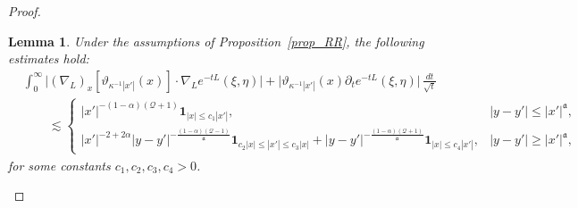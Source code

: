 \documentclass[12pt]{amsart}
\newtheorem{lemma}[theorem]{Lemma}
\begin{document}
\begin{proof}
\begin{lemma}\label{lemma_key2}
Under the assumptions of Proposition~\ref{prop_RR}, the following estimates hold:
\begin{align*}
    &\int_0^\infty  \bigl|(\nabla_L)_x [\vartheta_{\kappa^{-1} |x'|}(x)] \cdot \nabla_L e^{-tL}(\xi,\eta)\bigr| + \bigl|\vartheta_{\kappa^{-1} |x'|}(x) \partial_t e^{-tL}(\xi,\eta)\bigr| \, \frac{dt}{\sqrt{t}} \\
    &\qquad \lesssim 
    \begin{cases}
        |x'|^{-(1-\alpha)(\mathcal{Q}+1)} \mathbf{1}_{|x|\le c_1|x'|}, & |y-y'|\le |x'|^{\mathfrak a},\\[4pt]
        |x'|^{-2+2\alpha} |y-y'|^{-\frac{(1-\alpha)(\mathcal{Q}-1)}{\mathfrak a}} \mathbf{1}_{c_2|x|\le |x'| \le c_3|x|} + |y-y'|^{-\frac{(1-\alpha)(\mathcal{Q}+1)}{\mathfrak a}}\mathbf{1}_{|x|\le c_4|x'|}, & |y-y'|\ge |x'|^{\mathfrak a},
    \end{cases}
\end{align*}
for some constants $c_1,c_2,c_3,c_4>0$.
\end{lemma}


\end{proof}
\end{document}

